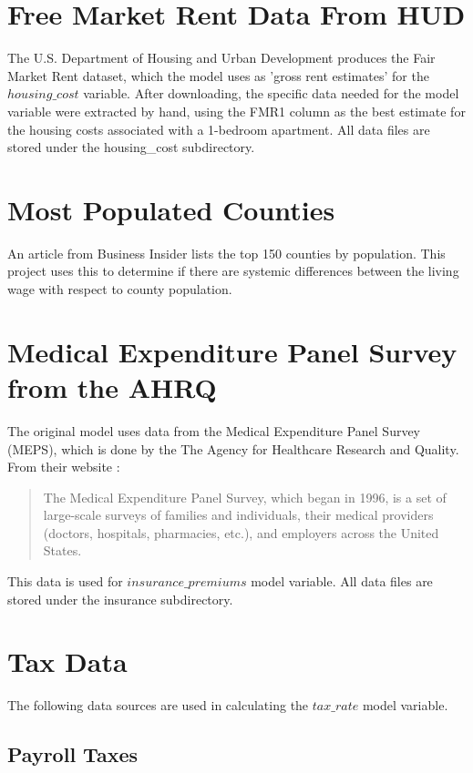 \section{Free Market Rent Data From HUD}

The U.S. Department of Housing and Urban Development produces the Fair Market Rent dataset, which the model uses as 'gross rent estimates' for the $housing\_cost$ variable. \cite{fmr} After downloading, the specific data needed for the model variable were extracted by hand, using the FMR1 column as the best estimate for the housing costs associated with a 1-bedroom apartment. All data files are stored under the housing\_cost subdirectory. 

\section{Most Populated Counties}

An article from Business Insider lists the top 150 counties by population. \cite{populated_counties} This project uses this to determine if there are systemic differences between the living wage with respect to county population.

\section{Medical Expenditure Panel Survey from the AHRQ}

The original model uses data from the Medical Expenditure Panel Survey (MEPS), which is done by the The Agency for Healthcare Research and Quality. From their website \cite{meps}:

\begin{quote}
The Medical Expenditure Panel Survey, which began in 1996, is a set of large-scale surveys of families and individuals, their medical providers (doctors, hospitals, pharmacies, etc.), and employers across the United States. 
\end{quote}

This data is used for $insurance\_premiums$ model variable. All data files are stored under the insurance subdirectory. 

\section{Tax Data}

The following data sources are used in calculating the $tax\_rate$ model variable.

\subsection{Payroll Taxes}

